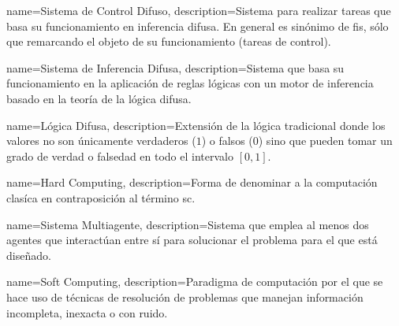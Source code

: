 

{
	name=Sistema de Control Difuso,
	description={Sistema para realizar tareas que basa su funcionamiento en inferencia difusa. En general es sinónimo de \gls{fis}, sólo que remarcando el objeto de su funcionamiento (tareas de control).}
}

{
	name=Sistema de Inferencia Difusa,
	description={Sistema que basa su funcionamiento en la aplicación de reglas lógicas con un motor de inferencia basado en la teoría de la lógica difusa.}
}

{
	name=Lógica Difusa,
	description={Extensión de la lógica tradicional donde los valores no son únicamente verdaderos ($1$) o falsos ($0$) sino que pueden tomar un grado de verdad o falsedad en todo el intervalo $[0, 1]$.}
}

{
	name=Hard Computing,
	description={Forma de denominar a la computación clasíca en contraposición al término \gls{sc}.}
}

{
	name=Sistema Multiagente,
	description={Sistema que emplea al menos dos agentes que interactúan entre sí para solucionar el problema para el que está diseñado.}
}

{
	name={Soft Computing},
	description={Paradigma de computación por el que se hace uso de técnicas de resolución de problemas que manejan información incompleta, inexacta o con ruido.}
}


